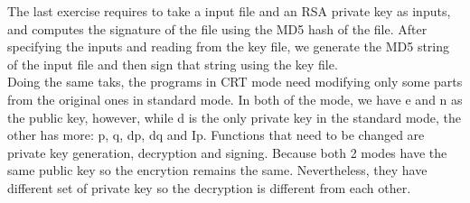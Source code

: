 \documentclass{article}
\begin{document}
The last exercise requires to take a input file and an RSA private key as inputs, and computes the signature of the file using the MD5 hash of the file. After specifying the inputs and reading from the key file, we generate the MD5 string of the input file and then sign that string using the key file. 
\\

Doing the same taks, the programs in CRT mode need modifying only some parts from the original ones in standard mode. In both of the mode, we have e and n as the public key, however, while d is the only private key in the standard mode, the other has more: p, q, dp, dq and Ip. Functions that need to be changed are private key generation, decryption and signing. Because both 2 modes have the same public key so the encrytion remains the same. Nevertheless, they have different set of private key so the decryption is different from each other. 
\end{document}
